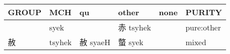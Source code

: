\documentclass[14pt,a4paper]{scrartcl}
\begin{document}
\begin{longtable}[c]{@{}llllll@{}}
\toprule
\begin{minipage}[b]{0.14\columnwidth}\raggedright\strut
GROUP
\strut\end{minipage} &
\begin{minipage}[b]{0.14\columnwidth}\raggedright\strut
MCH
\strut\end{minipage} &
\begin{minipage}[b]{0.14\columnwidth}\raggedright\strut
qu
\strut\end{minipage} &
\begin{minipage}[b]{0.14\columnwidth}\raggedright\strut
other
\strut\end{minipage} &
\begin{minipage}[b]{0.14\columnwidth}\raggedright\strut
none
\strut\end{minipage} &
\begin{minipage}[b]{0.14\columnwidth}\raggedright\strut
PURITY
\strut\end{minipage}\tabularnewline
\midrule
\endhead
\begin{minipage}[t]{0.14\columnwidth}\raggedright\strut
𤆍
\strut\end{minipage} &
\begin{minipage}[t]{0.14\columnwidth}\raggedright\strut
syek
\strut\end{minipage} &
\begin{minipage}[t]{0.14\columnwidth}\raggedright\strut
\strut\end{minipage} &
\begin{minipage}[t]{0.14\columnwidth}\raggedright\strut
赤 tsyhek
\strut\end{minipage} &
\begin{minipage}[t]{0.14\columnwidth}\raggedright\strut
\strut\end{minipage} &
\begin{minipage}[t]{0.14\columnwidth}\raggedright\strut
pure:other
\strut\end{minipage}\tabularnewline
\begin{minipage}[t]{0.14\columnwidth}\raggedright\strut
赦
\strut\end{minipage} &
\begin{minipage}[t]{0.14\columnwidth}\raggedright\strut
tsyhek
\strut\end{minipage} &
\begin{minipage}[t]{0.14\columnwidth}\raggedright\strut
赦 syaeH
\strut\end{minipage} &
\begin{minipage}[t]{0.14\columnwidth}\raggedright\strut
螫 syek
\strut\end{minipage} &
\begin{minipage}[t]{0.14\columnwidth}\raggedright\strut
\strut\end{minipage} &
\begin{minipage}[t]{0.14\columnwidth}\raggedright\strut
mixed
\strut\end{minipage}\tabularnewline
\bottomrule
\end{longtable}
\end{document}
